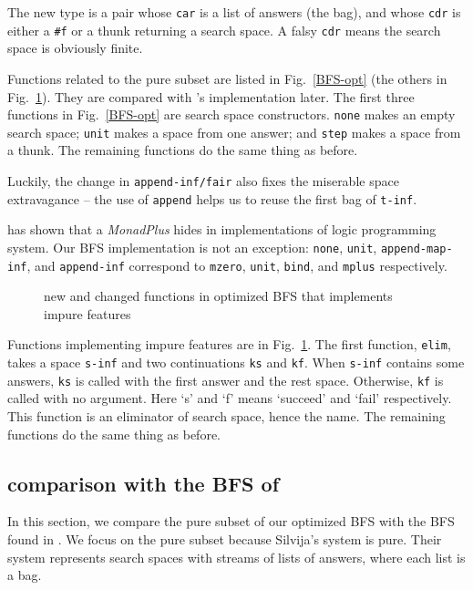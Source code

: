 \documentclass[format=acmlarge, review=true, authordraft=true]{acmart}
\begin{document}
The new type is a pair whose \texttt{car} is a list of answers (the bag), and 
whose \texttt{cdr} is either a \texttt{\#{}f} or a thunk returning a search 
space. A falsy \texttt{cdr} means the search space is obviously finite. 

Functions related to the pure subset are listed in Fig.~\ref{BFS-opt} (the 
others in Fig.~\ref{BFS-opt-cont}). They are compared with 
\citeauthor{seres1999algebra}'s implementation later. The first three functions 
in Fig.~\ref{BFS-opt} are search space constructors. \texttt{none} makes an 
empty search space; \texttt{unit} makes a space from one answer; and 
\texttt{step} makes a space from a thunk. The remaining functions do the same 
thing as before. 

Luckily, the change in \texttt{append-inf/fair} also fixes the miserable space 
extravagance -- the use of \texttt{append} helps us to reuse the first bag of 
\texttt{t-inf}.

\citet{kiselyov2005backtracking} has shown that a \emph{MonadPlus} hides in 
implementations of logic programming system. Our BFS implementation is not an 
exception: \texttt{none}, \texttt{unit}, \texttt{append-map-inf}, and 
\texttt{append-inf} correspond to \texttt{mzero}, \texttt{unit}, \texttt{bind}, 
and \texttt{mplus} respectively.

\begin{figure}
		
	\caption{new and changed functions in optimized BFS that implements impure 
		features}
	\label{BFS-opt-cont}
\end{figure}

Functions implementing impure features are in Fig.~\ref{BFS-opt-cont}. The 
first function, \texttt{elim}, takes a space \texttt{s-inf} and two 
continuations \texttt{ks} and \texttt{kf}. When \texttt{s-inf} contains some 
answers, \texttt{ks} is called with the first answer and the rest space. 
Otherwise, \texttt{kf} is called with no argument. Here `s' and `f' means 
`succeed' and `fail' respectively. This function is an eliminator of search 
space, hence the name. The remaining functions do the same thing as before.

\subsection{comparison with the BFS of \citet{seres1999algebra}}

In this section, we compare the pure subset of our optimized BFS with the BFS 
found in \citet{seres1999algebra}. We focus on the pure subset because 
Silvija's system is pure. Their system represents search spaces with streams of 
lists of answers, where each list is a bag.
\end{document}
